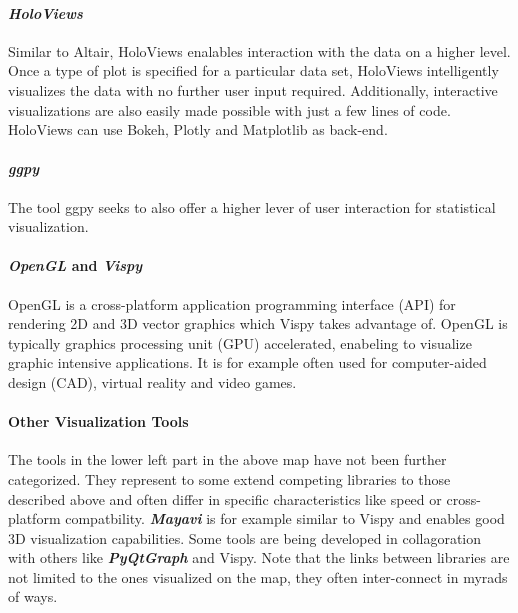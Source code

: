 \documentclass[11pt]{article}
\begin{document}
\paragraph{\texorpdfstring{\emph{HoloViews}}{HoloViews}}\label{holoviews}

Similar to Altair, HoloViews enalables interaction with the data on a
higher level. Once a type of plot is specified for a particular data
set, HoloViews intelligently visualizes the data with no further user
input required. Additionally, interactive visualizations are also easily
made possible with just a few lines of code. HoloViews can use Bokeh,
Plotly and Matplotlib as back-end.

\paragraph{\texorpdfstring{\emph{ggpy}}{ggpy}}\label{ggpy}

The tool ggpy seeks to also offer a higher lever of user interaction for
statistical visualization.

\paragraph{\texorpdfstring{\emph{OpenGL} and
\emph{Vispy}}{OpenGL and Vispy}}\label{opengl-and-vispy}

OpenGL is a cross-platform application programming interface (API) for
rendering 2D and 3D vector graphics which Vispy takes advantage of.
OpenGL is typically graphics processing unit (GPU) accelerated,
enabeling to visualize graphic intensive applications. It is for example
often used for computer-aided design (CAD), virtual reality and video
games.

\paragraph{Other Visualization Tools}\label{other-visualization-tools}

The tools in the lower left part in the above map have not been further
categorized. They represent to some extend competing libraries to those
described above and often differ in specific characteristics like speed
or cross-platform compatbility. \textbf{\emph{Mayavi}} is for example
similar to Vispy and enables good 3D visualization capabilities. Some
tools are being developed in collagoration with others like
\textbf{\emph{PyQtGraph}} and Vispy. Note that the links between
libraries are not limited to the ones visualized on the map, they often
inter-connect in myrads of ways.
\end{document}
